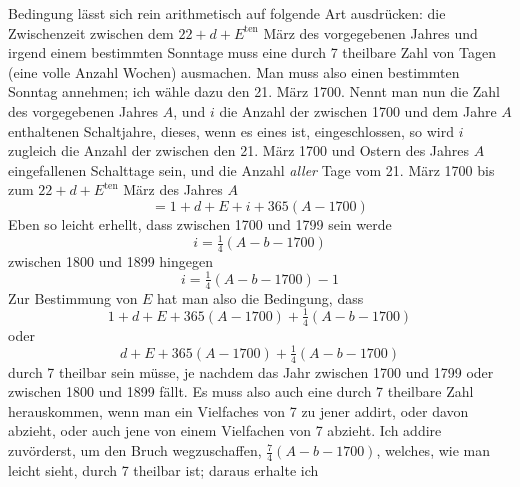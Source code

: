 Bedingung lässt sich rein arithmetisch auf folgende Art ausdrücken: die Zwischenzeit
zwischen dem $22+d+E^{\mathrm{ten}}$ März des vorgegebenen Jahres und irgend
einem bestimmten Sonntage muss eine durch 7 theilbare Zahl von Tagen (eine
volle Anzahl Wochen) ausmachen. Man muss also einen bestimmten Sonntag
annehmen; ich wähle dazu den 21. März 1700. Nennt man nun die Zahl des
vorgegebenen Jahres $A$, und $i$ die Anzahl der zwischen 1700 und dem Jahre $A$
enthaltenen Schaltjahre, dieses, wenn es eines ist, eingeschlossen, so wird $i$ zugleich
die Anzahl der zwischen den 21. März 1700 und Ostern des Jahres $A$ eingefallenen
Schalttage sein, und die Anzahl \textit{aller} Tage vom 21. März 1700 bis
zum $22+d+E^{\mathrm{ten}}$ März des Jahres $A$
\[
=1+d+E+i+365(A-1700)
\]
Eben so leicht erhellt, dass zwischen 1700 und 1799 sein werde
\[
i=\tfrac14(A-b-1700)
\]
zwischen 1800 und 1899 hingegen
\[
i=\tfrac14(A-b-1700)-1
\]
Zur Bestimmung von $E$ hat man also die Bedingung, dass
\[
1+d+E+365(A-1700)+\tfrac14(A-b-1700)
\]
oder
\[
d+E+365(A-1700)+\tfrac14(A-b-1700)
\]
durch 7 theilbar sein müsse, je nachdem das Jahr zwischen 1700 und 1799 oder
zwischen 1800 und 1899 fällt. Es muss also auch eine durch 7 theilbare Zahl
herauskommen, wenn man ein Vielfaches von 7 zu jener addirt, oder davon abzieht,
oder auch jene von einem Vielfachen von 7 abzieht. Ich addire zuvörderst,
um den Bruch wegzuschaffen, $\frac74(A-b-1700)$, welches, wie man leicht
sieht, durch 7 theilbar ist; daraus erhalte ich
\par\clearpage
\endgroup
